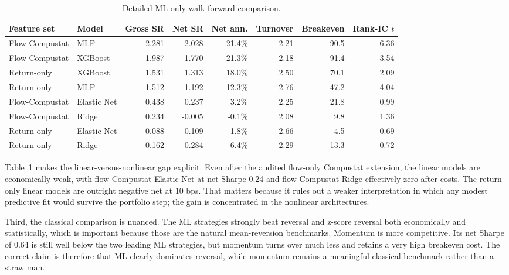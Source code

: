 \begin{table}[t]
\centering
\scriptsize
\setlength{\tabcolsep}{4.5pt}
\begin{tabular*}{\textwidth}{@{\extracolsep{\fill}} llrrrrrr@{}}
\toprule
Feature set & Model & Gross SR & Net SR & Net ann. & Turnover & Breakeven & Rank-IC $t$ \\
\midrule
Flow-Compustat & MLP & 2.281 & 2.028 & 21.4\% & 2.21 & 90.5 & 6.36 \\
Flow-Compustat & XGBoost & 1.987 & 1.770 & 21.3\% & 2.18 & 91.4 & 3.54 \\
Return-only & XGBoost & 1.531 & 1.313 & 18.0\% & 2.50 & 70.1 & 2.09 \\
Return-only & MLP & 1.512 & 1.192 & 12.3\% & 2.76 & 47.2 & 4.04 \\
Flow-Compustat & Elastic Net & 0.438 & 0.237 & 3.2\% & 2.25 & 21.8 & 0.99 \\
Flow-Compustat & Ridge & 0.234 & -0.005 & -0.1\% & 2.08 & 9.8 & 1.36 \\
Return-only & Elastic Net & 0.088 & -0.109 & -1.8\% & 2.66 & 4.5 & 0.69 \\
Return-only & Ridge & -0.162 & -0.284 & -6.4\% & 2.29 & -13.3 & -0.72 \\
\bottomrule
\end{tabular*}
\caption{Detailed ML-only walk-forward comparison.
}
\label{tab:ml-detail}
\end{table}

Table~\ref{tab:ml-detail} makes the linear-versus-nonlinear gap explicit. Even
after the audited flow-only Compustat extension, the linear models are
economically weak, with flow-Compustat Elastic Net at net Sharpe 0.24 and
flow-Compustat Ridge effectively zero after costs. The return-only linear
models are outright negative net at 10 bps. That matters because it rules out
a weaker interpretation in which any modest predictive fit would survive the
portfolio step; the gain is concentrated in the nonlinear architectures.

Third, the classical comparison is nuanced. The ML strategies strongly beat
reversal and z-score reversal both economically and statistically, which is
important because those are the natural mean-reversion benchmarks. Momentum is
more competitive. Its net Sharpe of 0.64 is still well below the two leading
ML strategies, but momentum turns over much less and retains a very high
breakeven cost. The correct claim is therefore that ML clearly dominates
reversal, while momentum remains a meaningful classical benchmark rather than
a straw man.

